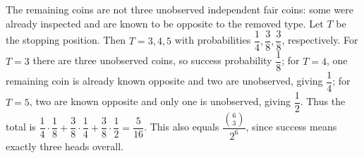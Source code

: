The remaining coins are not three unobserved independent fair coins: some were already inspected and are known to be opposite to the removed type. Let $T$ be the stopping position. Then $T=3,4,5$ with probabilities $\dfrac{1}{4},\dfrac{3}{8},\dfrac{3}{8}$, respectively. For $T=3$ there are three unobserved coins, so success probability $\dfrac{1}{8}$; for $T=4$, one remaining coin is already known opposite and two are unobserved, giving $\dfrac{1}{4}$; for $T=5$, two are known opposite and only one is unobserved, giving $\dfrac{1}{2}$. Thus the total is $\dfrac{1}{4}\cdot\dfrac{1}{8}+\dfrac{3}{8}\cdot\dfrac{1}{4}+\dfrac{3}{8}\cdot\dfrac{1}{2}=\boxed{\dfrac{5}{16}}$. This also equals $\dfrac{\binom63}{2^6}$, since success means exactly three heads overall.
